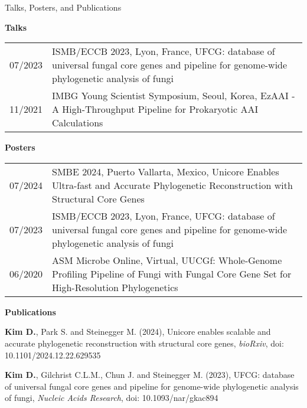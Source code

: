 \documentclass{resume} %
\begin{document}
\begin{rSection}{Talks, Posters, and Publications}
\vspace{2mm}

{\bf Talks }\vspace{1mm}

\begin{tabular}{p{2.5cm}p{14.1cm}}
07/2023 & ISMB/ECCB 2023, Lyon, France, UFCG: database of universal fungal core genes and pipeline for genome-wide phylogenetic analysis of fungi
\\[1mm]
11/2021 & IMBG Young Scientist Symposium, Seoul, Korea, EzAAI - A High-Throughput Pipeline for Prokaryotic AAI Calculations
\\[1mm]
\end{tabular}
\vspace{1mm}

{\bf Posters }\vspace{1mm}

\begin{tabular}{p{2.5cm}p{14.1cm}}
07/2024 & SMBE 2024, Puerto Vallarta, Mexico, Unicore Enables Ultra-fast and Accurate Phylogenetic Reconstruction with Structural Core Genes
\\[1mm]
07/2023 & ISMB/ECCB 2023, Lyon, France, UFCG: database of universal fungal core genes and pipeline for genome-wide phylogenetic analysis of fungi
\\[1mm]
06/2020 & ASM Microbe Online, Virtual, UUCGf: Whole-Genome Profiling Pipeline of Fungi with Fungal Core Gene Set for High-Resolution Phylogenetics
\\[1mm]
\end{tabular}
\vspace{1mm}


{\bf Publications}\\[-26mm]

\begin{thebibliography}{10}

\vspace{8mm}
{\bf Kim D.}, Park S. and Steinegger M. (2024),
Unicore enables scalable and accurate phylogenetic reconstruction with structural core genes, {\em bioRxiv}, doi: 10.1101/2024.12.22.629535
	
{\bf Kim D.}, Gilchrist C.L.M., Chun J. and Steinegger M. (2023),
UFCG: database of universal fungal core genes and pipeline for genome-wide phylogenetic analysis of fungi, {\em Nucleic Acids Research}, doi: 10.1093/nar/gkac894


\end{thebibliography}
\end{rSection}
\end{document}
